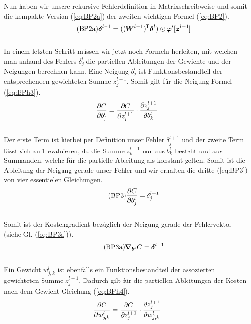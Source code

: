 \begin{appendices}
Nun haben wir unsere rekursive Fehlerdefinition in Matrixschreibweise und somit
die kompakte Version (\ref{eq:BP2a}) der zweiten wichtigen Formel (\ref{eq:BP2}).
\\
\begin{equation}\tag{BP2a}\label{eq:BP2a}
  \bm{\delta}^{l-1} = ((\bm{W}^{l-1})^{\mathsf{T}} \bm{\delta}^l) \odot \bm{\varphi}'[\bm{z}^{l-1}]
\end{equation}
\\
In einem letzten Schritt müssen wir jetzt noch Formeln herleiten, mit welchen
man anhand des Fehlers $\delta_j^l$ die partiellen Ableitungen der Gewichte und
der Neigungen berechnen kann.
\para{}
Eine Neigung $b_j^l$ ist Funktionsbestandteil der entsprechenden gewichteten
Summe $z_j^{l+1}$. Somit gilt für die Neigung Formel (\ref{eq:BPh3}).
\\
\begin{equation}\label{eq:BPh3}
  \frac{\partial C}{\partial b_j^l} = \frac{\partial C}{\partial z_j^{l+1}} \cdot \frac{\partial z_j^{l+1}}{\partial b_k^l}
\end{equation}
\\
Der erste Term ist hierbei per Definition unser Fehler $\delta_j^{l+1}$ und der
zweite Term lässt sich zu 1 evaluieren, da die Summe $z_k^{l+1}$ nur aus
$b_k^l$ besteht und aus Summanden, welche für die partielle Ableitung als konstant gelten.
Somit ist die Ableitung der Neigung gerade unser Fehler und wir erhalten die
dritte (\ref{eq:BP3}) von vier essentielen Gleichungen.
\\
\begin{equation}\tag{BP3}\label{eq:BP3}
  \frac{\partial C}{\partial b_j^l} = \delta_j^{l+1}
\end{equation}
\\
Somit ist der Kostengradient bezüglich der Neigung gerade der Fehlervektor
(siehe Gl. (\ref{eq:BP3a})).
\\
\begin{equation}\tag{BP3a}\label{eq:BP3a}
  \bm{\nabla}_{\bm{b^l}} C =  \bm{\delta}^{l+1}
\end{equation}
\\
Ein Gewicht $w_{j,k}^l$ ist ebenfalls ein Funktionsbestandteil der assozierten
gewichteten Summe $z_j^{l+1}$. Dadurch gilt für die partiellen Ableitungen der
Kosten nach dem Gewicht Gleichung (\ref{eq:BPh4}).
\\
\begin{equation}\label{eq:BPh4}
  \frac{\partial C}{\partial w_{j,k}^l} = \frac{\partial C}{\partial z_j^{l+1}} \cdot \frac{\partial z_j^{l+1}}{\partial w_{j,k}^l}
\end{equation}

\end{appendices}
